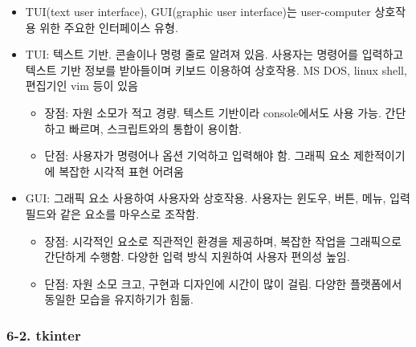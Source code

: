 \begin{itemize}
\tightlist
\item
  TUI(text user interface), GUI(graphic user interface)는 user-computer
  상호작용 위한 주요한 인터페이스 유형.
\item
  TUI: 텍스트 기반. 콘솔이나 명령 줄로 알려져 있음. 사용자는 명령어를
  입력하고 텍스트 기반 정보를 받아들이며 키보드 이용하여 상호작용. MS
  DOS, linux shell, 편집기인 vim 등이 있음

  \begin{itemize}
  \tightlist
  \item
    장점: 자원 소모가 적고 경량. 텍스트 기반이라 console에서도 사용
    가능. 간단하고 빠르며, 스크립트와의 통합이 용이함.
  \item
    단점: 사용자가 명령어나 옵션 기억하고 입력해야 함. 그래픽 요소
    제한적이기에 복잡한 시각적 표현 어려움
  \end{itemize}
\item
  GUI: 그래픽 요소 사용하여 사용자와 상호작용. 사용자는 윈도우, 버튼,
  메뉴, 입력 필드와 같은 요소를 마우스로 조작함.

  \begin{itemize}
  \tightlist
  \item
    장점: 시각적인 요소로 직관적인 환경을 제공하며, 복잡한 작업을
    그래픽으로 간단하게 수행함. 다양한 입력 방식 지원하여 사용자 편의성
    높임.
  \item
    단점: 자원 소모 크고, 구현과 디자인에 시간이 많이 걸림. 다양한
    플랫폼에서 동일한 모습을 유지하기가 힘듦.
  \end{itemize}
\end{itemize}

\hypertarget{tkinter}{%
\subsubsection{6-2. tkinter}\label{tkinter}}

